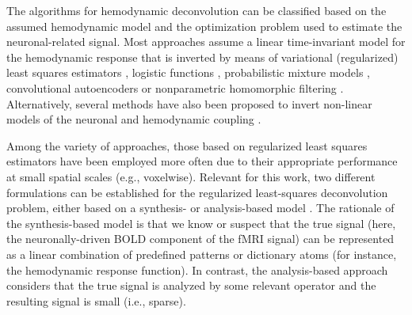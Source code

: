 The algorithms for hemodynamic deconvolution can be classified based on the
assumed hemodynamic model and the optimization problem used to estimate the
neuronal-related signal. Most approaches assume a linear time-invariant model
for the hemodynamic response that is inverted by means of variational
(regularized) least squares estimators
\citep{Glover1999DeconvolutionImpulseResponse,Gitelman2003Modelingregionalpsychophysiologic,
Gaudes2010Detectioncharacterizationsingle,Gaudes2012Structuredsparsedeconvolution,
Gaudes2013Paradigmfreemapping,CaballeroGaudes2019deconvolutionalgorithmmulti,
HernandezGarcia2011Neuronaleventdetection,Karahanoglu2013TotalactivationfMRI,
Cherkaoui2019SparsitybasedBlind,Costantini2021ParadigmFreeRegularization,
Huetel2021Hemodynamicmatrixfactorization},
logistic functions
\citep{Bush2013Decodingneuralevents,Bush2015deconvolutionbasedapproach,
Loula2018DecodingfMRIactivity},
probabilistic mixture models \citep{Pidnebesna2019EstimatingSparseNeuronal},
convolutional autoencoders \citep{Huetel2018NeuralActivationEstimation} or
nonparametric homomorphic filtering
\citep{Sreenivasan2015NonparametricHemodynamicDeconvolution}. Alternatively,
several methods have also been proposed to invert non-linear models of the
neuronal and hemodynamic coupling
\citep{Riera2004statespacemodel,Penny2005Bilineardynamicalsystems,Friston2008DEMvariationaltreatment,
Havlicek2011Dynamicmodelingneuronal,Aslan2016Jointstateparameter,
Madi2017HybridCubatureKalman,RuizEuler2018NonlinearDeconvolutionSampling}.

Among the variety of approaches, those based on regularized least squares
estimators have been employed more often due to their appropriate performance at
small spatial scales (e.g., voxelwise). Relevant for this work, two different
formulations can be established for the regularized least-squares deconvolution
problem, either based on a synthesis- or analysis-based model
\citep{Elad2007Analysisversussynthesis,ortelli2019synthesis}. The rationale
of the synthesis-based model is that we know or suspect that the true signal
(here, the neuronally-driven BOLD component of the fMRI signal) can be
represented as a linear combination of predefined patterns or dictionary atoms
(for instance, the hemodynamic response function). In contrast, the
analysis-based approach considers that the true signal is analyzed by some
relevant operator and the resulting signal is small (i.e., sparse).

